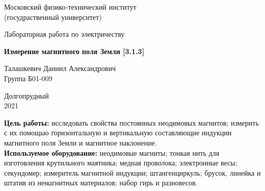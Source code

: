 \documentclass[a4paper, 12pt]{article}%
\begin{document}


\begin{titlepage}

	\newpage
	\begin{center}
		\normalsize Московский физико-технический институт \\(госудраственный 			университет)
	\end{center}

	\vspace{6em}

	\begin{center}
		\Large Лабораторная работа по электричеству\\
	\end{center}

	\vspace{1em}

	\begin{center}
		\large \textbf{Измерение магнитного поля Земли [3.1.3]}
	\end{center}

	\vspace{2em}

	\begin{center}
		\large Талашкевич Даниил Александрович\\
		Группа Б01-009
	\end{center}

	\vspace{\fill}

	\begin{center}
	Долгопрудный \\2021
	\end{center}
	
\end{titlepage}



	\thispagestyle{empty}
	\newpage
	\tableofcontents
	\newpage
	\setcounter{page}{1}



\textbf{Цель работы:} исследовать свойства постоянных неодимовых магнитов; измерить с их помощью горизонтальную и вертикальную составляющие индукции магнитного поля Земли и магнитное наклонение. \\

\textbf{Используемое оборудование:} неодимовые магниты; тонкая нить для изготовления крутильного маятника; медная проволока; электронные весы; секундомер; измеритель магнитной индукции; штангенциркуль; брусок, линейка и штатив из немагнитных материалов; набор гирь и разновесов.
\end{document}
